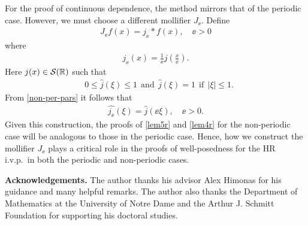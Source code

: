For the proof of continuous dependence, the method mirrors that 
of the periodic case. However, we must choose a different mollifier 
$J_\ee$. Define
\begin{equation}
\begin{split}
J_\ee f(x) = j_\ee * f(x), \quad \ee>0
\end{split}
\end{equation}
%
%
where 
\begin{equation}
	\label{non-per-pars}
\begin{split}
j_\ee(x) = \frac{1}{\ee} j \left (\frac{x}{\ee} \right ).
\end{split}
\end{equation}
Here
$j(x) \in \mathcal{S}(\mathbb{R})$ such that
%
%
\begin{equation}
\begin{split}
	& 0 \le \widehat{j}(\xi) \le 1 \ \ \text{and}
	\ \ \widehat{j}(\xi) = 1 \ \ \text{if} \ \ |\xi| \le 1.
\end{split}
\end{equation}
%
%
%
%
%
%
%
%
From \eqref{non-per-pars} it follows that 
%
%
\begin{equation}
\begin{split}
\widehat{j_\ee}(\xi) = \widehat{j }(\ee \xi), \quad \ee > 0.
\end{split}
\end{equation}
%
%
%
%
Given this construction, the proofs of \cref{lem5r} and 
\cref{lem4r} for the non-periodic case will be
analogous to those in the periodic case.
Hence, how we
construct the mollifier $J_\ee$ plays a critical role in the proofs of
well-posedness for the HR i.v.p.\ in both the periodic and non-periodic 
cases. %

{\bf Acknowledgements.} The author thanks his advisor Alex Himonas for 
his guidance and many helpful remarks. The author also thanks the Department of 
Mathematics at the University of Notre Dame and the Arthur J. Schmitt Foundation for 
supporting his doctoral 
studies.
%
%
%
